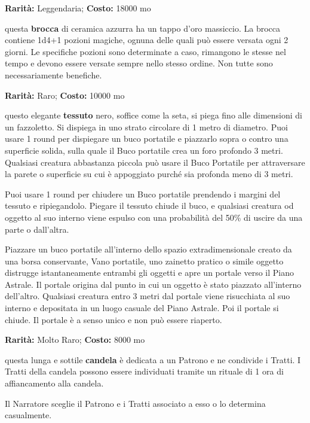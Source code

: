 \begin{multicols}{2}

\textbf{Rarità:} Leggendaria; \textbf{Costo:} 18000 mo

questa \textbf{brocca} di ceramica azzurra ha un tappo d'oro massiccio. La brocca contiene 1d4+1 pozioni magiche, ognuna delle quali può essere versata ogni 2 giorni. Le specifiche pozioni sono determinate a caso, rimangono le stesse nel tempo e devono essere versate sempre nello stesso ordine. Non tutte sono necessariamente benefiche.


\textbf{Rarità:} Raro; \textbf{Costo:} 10000 mo

questo elegante \textbf{tessuto} nero, soffice come la seta, si piega fino alle dimensioni di un fazzoletto. Si dispiega in uno strato circolare di 1 metro di diametro. Puoi usare 1 round per dispiegare un buco portatile e piazzarlo sopra o contro una superficie solida, sulla quale il Buco portatile crea un foro profondo 3 metri. Qualsiasi creatura abbastanza piccola può usare il Buco Portatile per attraversare la parete o superficie su cui è appoggiato purché sia profonda meno di 3 metri.

Puoi usare 1 round per chiudere un Buco portatile prendendo i margini del tessuto e ripiegandolo. Piegare il tessuto chiude il buco, e qualsiasi creatura od oggetto al suo interno viene espulso con una probabilità del 50\% di uscire da una parte o dall'altra.

Piazzare un buco portatile all'interno dello spazio extradimensionale creato da una borsa conservante, Vano portatile, uno zainetto pratico o simile oggetto distrugge istantaneamente entrambi gli oggetti e apre un portale verso il Piano Astrale. Il portale origina dal punto in cui un oggetto è stato piazzato all'interno dell'altro. Qualsiasi creatura entro 3 metri dal portale viene risucchiata al suo interno e depositata in un luogo casuale del Piano Astrale. Poi il portale si chiude. Il portale è a senso unico e non può essere riaperto.


\textbf{Rarità:} Molto Raro; \textbf{Costo:} 8000 mo

questa lunga e sottile \textbf{candela} è dedicata a un Patrono e ne condivide i Tratti. I Tratti della candela possono essere individuati tramite un rituale di 1 ora di affiancamento alla candela.

Il Narratore sceglie il Patrono e i Tratti associato a esso o lo determina casualmente.


\end{multicols}
